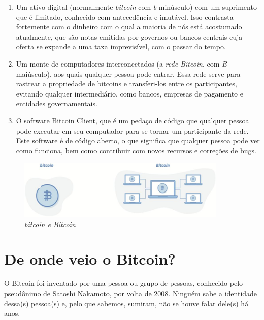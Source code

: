 \begin{samepage}
\begin{enumerate}
\item Um ativo digital (normalmente \textit{bitcoin} com \textit{b} minúsculo) com um suprimento que é limitado, conhecido com antecedência e imutável. Isso contrasta fortemente com o dinheiro com o qual a maioria de nós está acostumado atualmente, que são notas emitidas por governos ou bancos centrais cuja oferta se expande a uma taxa imprevisível, com o passar do tempo.
\item Um monte de computadores interconectados (a \textit{rede Bitcoin}, com \textit{B} maiúsculo), aos quais qualquer pessoa pode entrar. Essa rede serve para rastrear a propriedade de bitcoins e transferi-los entre os participantes, evitando qualquer intermediário, como bancos, empresas de pagamento e entidades governamentais.
\item O software Bitcoin Client, que é um pedaço de código que qualquer pessoa pode executar em seu computador para se tornar um participante da rede. Este software é de código aberto, o que significa que qualquer pessoa pode ver como funciona, bem como contribuir com novos recursos e correções de bugs.
\end{enumerate}
\end{samepage}


\begin{figure}
  \centering
  \includegraphics[width=10cm]{imagens/bitcoin-capitulo-1.png}
  \caption*{\textit{\small bitcoin e Bitcoin}}
\end{figure}
  
\section*{De onde veio o Bitcoin?}

O Bitcoin foi inventado por uma pessoa ou grupo de pessoas, conhecido pelo pseudônimo de Satoshi Nakamoto, por volta de 2008. Ninguém sabe a identidade dessa(s) pessoa(s) e, pelo que sabemos, sumiram, não se houve falar dele(s) há anos.

